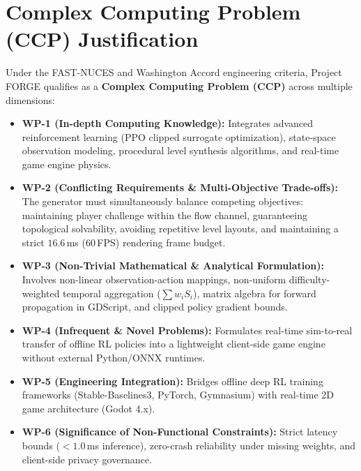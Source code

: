 \section{Complex Computing Problem (CCP) Justification}
Under the FAST-NUCES and Washington Accord engineering criteria, Project FORGE qualifies as a \textbf{Complex Computing Problem (CCP)} across multiple dimensions:
\begin{itemize}
    \item \textbf{WP-1 (In-depth Computing Knowledge):} Integrates advanced reinforcement learning (PPO clipped surrogate optimization), state-space observation modeling, procedural level synthesis algorithms, and real-time game engine physics.
    \item \textbf{WP-2 (Conflicting Requirements \& Multi-Objective Trade-offs):} The generator must simultaneously balance competing objectives: maintaining player challenge within the flow channel, guaranteeing topological solvability, avoiding repetitive level layouts, and maintaining a strict $16.6$\,ms (60\,FPS) rendering frame budget.
    \item \textbf{WP-3 (Non-Trivial Mathematical \& Analytical Formulation):} Involves non-linear observation-action mappings, non-uniform difficulty-weighted temporal aggregation ($\sum w_i S_i$), matrix algebra for forward propagation in GDScript, and clipped policy gradient bounds.
    \item \textbf{WP-4 (Infrequent \& Novel Problems):} Formulates real-time sim-to-real transfer of offline RL policies into a lightweight client-side game engine without external Python/ONNX runtimes.
    \item \textbf{WP-5 (Engineering Integration):} Bridges offline deep RL training frameworks (Stable-Baselines3, PyTorch, Gymnasium) with real-time 2D game architecture (Godot 4.x).
    \item \textbf{WP-6 (Significance of Non-Functional Constraints):} Strict latency bounds ($<1.0$\,ms inference), zero-crash reliability under missing weights, and client-side privacy governance.
\end{itemize}

